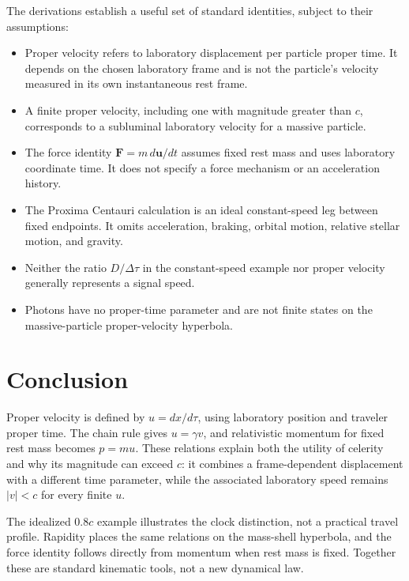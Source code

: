 \documentclass[12pt]{article}
\begin{document}
The derivations establish a useful set of standard identities, subject to their assumptions:
\begin{itemize}[leftmargin=*]
  \item Proper velocity refers to laboratory displacement per particle proper time. It depends on the chosen laboratory frame and is not the particle's velocity measured in its own instantaneous rest frame.
  \item A finite proper velocity, including one with magnitude greater than $c$, corresponds to a subluminal laboratory velocity for a massive particle.
  \item The force identity $\mathbf F=m\,d\mathbf u/dt$ assumes fixed rest mass and uses laboratory coordinate time. It does not specify a force mechanism or an acceleration history.
  \item The Proxima Centauri calculation is an ideal constant-speed leg between fixed endpoints. It omits acceleration, braking, orbital motion, relative stellar motion, and gravity.
  \item Neither the ratio $D/\Delta\tau$ in the constant-speed example nor proper velocity generally represents a signal speed.
  \item Photons have no proper-time parameter and are not finite states on the massive-particle proper-velocity hyperbola.
\end{itemize}

\section{Conclusion}
\label{sec:conclusion}

Proper velocity is defined by $u=dx/d\tau$, using laboratory position and traveler proper time. The chain rule gives $u=\gamma v$, and relativistic momentum for fixed rest mass becomes $p=mu$. These relations explain both the utility of celerity and why its magnitude can exceed $c$: it combines a frame-dependent displacement with a different time parameter, while the associated laboratory speed remains $|v|<c$ for every finite $u$.

The idealized $0.8c$ example illustrates the clock distinction, not a practical travel profile. Rapidity places the same relations on the mass-shell hyperbola, and the force identity follows directly from momentum when rest mass is fixed. Together these are standard kinematic tools, not a new dynamical law.

\appendix
\clearpage
\end{document}
